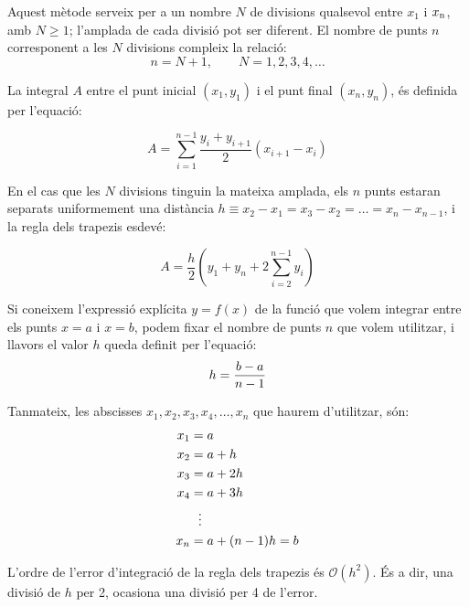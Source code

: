 Aquest mètode serveix per a un nombre  $N$ de divisions qualsevol  entre $x_1$ i $x_\mathrm{n}$, amb $N \geq 1$; l'amplada de cada divisió pot ser diferent.  El nombre de punts $n$ corresponent a les $N$ divisions compleix la relació: 
\begin{equation}
n = N+1, \qquad N = 1, 2, 3, 4, \dots
\end{equation}

La integral $A$ entre el punt inicial $(x_1, y_1)$ i el punt final $(x_n, y_n)$, és definida per l'equació:

 \begin{equation}\label{eq:trap-uneven}
    A = \sum_{i=1}^{n-1} \frac{y_i + y_{i+1}}{2} (x_{i+1}-x_i)
 \end{equation}

En el cas que les $N$ divisions tinguin la mateixa amplada, els  $n$ punts estaran separats uniformement una distància $h \equiv x_2-x_1 = x_3-x_2 = \dots = x_n-x_{n-1}$, i la regla dels trapezis esdevé:

 \begin{equation}\label{eq:trap}
    A = \frac{h}{2} \left( y_1 + y_n + 2 \sum_{i=2}^{n-1} y_i \right)
 \end{equation}

Si coneixem l'expressió explícita $y=f(x)$ de la funció que volem integrar entre els punts $x=a$ i $x=b$, podem fixar el nombre de punts $n$ que volem utilitzar, i llavors el valor $h$ queda definit per l'equació:
\begin{equation}\label{eq:trap_1}
    h = \frac{b-a}{n-1}\\
\end{equation}

Tanmateix, les abscisses $x_1, x_2, x_3,x_4, \dotsc , x_n$ que haurem d'utilitzar, són:
\begin{align}\label{eq:trap_2}
    x_1 &= a \notag\\
    x_2 &= a + h \notag\\
    x_3 &= a + 2 h \notag\\
    x_4 &= a + 3 h\\
    {} &\hspace{1.5ex}\vdots {} \notag\\
    x_n &= a + (n-1)h =b \notag
\end{align}

L'ordre de l'error d'integració de la regla dels trapezis és $\mathscr{O}(h^2)$. És a dir, una divisió de $h$ per 2, ocasiona una divisió per 4 de l'error.

